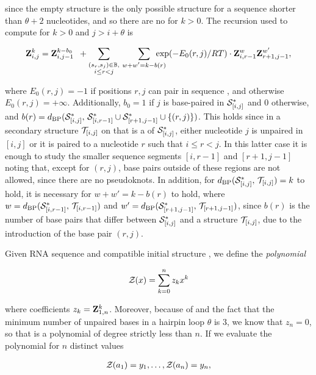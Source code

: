 since the empty structure is the only possible structure for a
sequence shorter than $\theta + 2$ nucleotides, and so there are no
\kNbrs for $k>0$. The recursion used to compute
 for $k > 0$ and $j > i+\theta$ is

\begin{align}
\label{eq:fftbor:bfZkij}
\bfZ{k}{i,j} = \bfZ{k-b_0}{i,j-1}\enspace +
\sum_{\substack{(s_r,s_j) \in \bpSet, \\ i \leq r<j}}\qquad
\sum_{\mathclap{w+w'=k-b(r)}}\enspace
\exp(-E_0(r,j)/RT) \cdot \bfZ{w}{i,r-1} \bfZ{w'}{r+1,j-1},
\end{align}

where $E_0(r,j) = -1$ if positions $r,j$ can pair in sequence \seq,
and otherwise $E_0(r,j) = +\infty$. Additionally,
$b_0 = 1$ if $j$ is base-paired
in $\mathcal S^*_{[i,j]}$ and $0$ otherwise, and
$b(r)=d_{\text{BP}}(\mathcal S^*_{[i,j]},\,\mathcal S^*_{[i,r-1]} \cup \mathcal S^*_{[r+1,j-1]} \cup\{(r,j)\})$.
This holds since in a secondary
structure $\mathcal T_{[i,j]}$ on \seqIJ that is a \kNbr of
$\mathcal S^*_{[i,j]}$,
either nucleotide $j$ is unpaired in $[i,j]$ or it is
paired to a nucleotide $r$ such that $i \leq r < j$. In this
latter case it is enough to study the smaller sequence segments
$[i,r-1]$ and $[r+1,j-1]$ noting that, except for $(r,j)$,
base pairs outside of these regions are not allowed, since there
are no pseudoknots. In addition,
for $d_{\text{BP}}(\mathcal S^*_{[i,j]},\,\mathcal T_{[i,j]}) = k$ to hold,
it is necessary for $w+w' = k -b(r)$ to hold, where $w =
d_{\text{BP}}(\mathcal S^*_{[i,r-1]},\,\mathcal T_{[i,r-1]})$ and $w' =
d_{\text{BP}}(\mathcal S^*_{[r+1,j-1]},\,\mathcal T_{[r+1,j-1]})$, since $b(r)$ is the
number of base pairs that differ between $\mathcal S^*_{[i,j]}$ and a
structure $\mathcal T_{[i,j]}$, due to the introduction of the base pair
$(r,j)$.

Given RNA sequence \seq and compatible initial structure \strSt,
we define the {\em polynomial}

\begin{align}
\label{eq:fftbor:zOfX}
\fullZx = \sum_{k=0}^n z_k x^k
\end{align}

where coefficients $z_k={\bf Z}^{k}_{1,n}$. Moreover, because of
 and the fact that the minimum number of
unpaired bases in a hairpin loop $\theta$ is $3$, we know that $z_n=0$,
so that \fullZx is a polynomial of degree strictly less than $n$.
If we evaluate the polynomial \fullZx for $n$ distinct values

\begin{align}
\label{eq:fftbor:solutionsForAlpha}
\emZof{}{a_1} = y_1, \dots, \emZof{}{a_n} = y_n,
\end{align}

